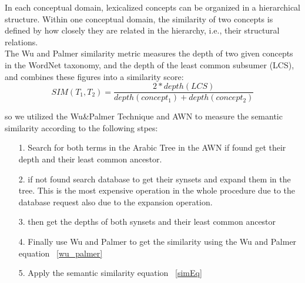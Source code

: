 In each conceptual domain, lexicalized concepts can be organized in a hierarchical structure. Within one conceptual domain, the similarity of two concepts is defined by how closely they are related in the hierarchy, i.e., their structural relations.\\
The Wu and Palmer \citep{wu} similarity metric measures the depth of two given concepts in the WordNet taxonomy, and the depth of the least common subsumer (LCS), and combines these figures into a similarity score:
\begin{equation}
\label{wu_palmer}
SIM({T_{1}},{T_{2}}) =\frac{2 * depth(LCS)}{depth(concept_1)+ depth(concept_2)} 
\end{equation}

so we utilized the Wu\&Palmer Technique and AWN to measure the semantic similarity according to the following stpes:
\begin{itemize}
\item [1.] Search for both terms in the Arabic Tree in the AWN if found get their depth and their least common ancestor.
\item [2.] if not found search database to get their synsets and expand them in the tree. This is the most expensive operation in the whole procedure due to the database request also due to the expansion operation.
\item [3.] then get the depths of both synsets and their least common ancestor 
\item [4.] Finally use Wu and Palmer to get the similarity using the Wu and Palmer equation ~\ref{wu_palmer}
\item [5.] Apply the semantic similarity equation ~\ref{simEq}
\end{itemize}

